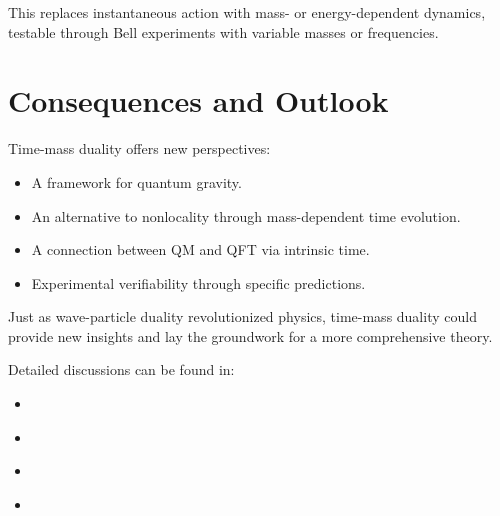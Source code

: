 \documentclass[a4paper,12pt]{article}
\begin{document}
	This replaces instantaneous action with mass- or energy-dependent dynamics, testable through Bell experiments with variable masses or frequencies.
	
	\section{Consequences and Outlook}
	
	Time-mass duality offers new perspectives:
	\begin{itemize}
		\item A framework for quantum gravity.
		\item An alternative to nonlocality through mass-dependent time evolution.
		\item A connection between QM and QFT via intrinsic time.
		\item Experimental verifiability through specific predictions.
	\end{itemize}
	
	Just as wave-particle duality revolutionized physics, time-mass duality could provide new insights and lay the groundwork for a more comprehensive theory.
	
	Detailed discussions can be found in:
	\begin{itemize}
		\item \cite{pascher_planck_2025}
		\item \cite{pascher_params_2025}
		\item \cite{pascher_photons_2025}
		\item \cite{pascher_quantum_2025}
	\end{itemize}
	
\end{document}
